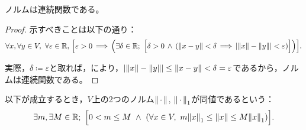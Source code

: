\documentclass[b5paper,oneside,openany]{ltjsbook} %
\begin{document}
\begin{cor}[ノルムの連続性]
    ノルムは連続関数である。
    \begin{proof}
        示すべきことは以下の通り：
        \begin{equation}
            \forall x,\forall y\in V,\ \forall \varepsilon\in\R,\, \squ{
                \varepsilon>0 \, \Longrightarrow\, \pare{
                    \exists \delta\in \R;\ \bsqu{
                        \delta>0\, \land\, \pare{
                            \norm{x-y}<\delta\, \Longrightarrow\, \abs{\norm{x}-\norm{y}}<\varepsilon
                        }
                    }
                }
            }.
        \end{equation}

        実際，$\delta\coloneqq \varepsilon$と取れば，により，$\abs{\norm{x}-\norm{y}}\leq \norm{x-y}<\delta =\varepsilon$であるから，ノルムは連続関数である。
    \end{proof}
\end{cor}

\begin{defi}[ノルムの同値性]
    以下が成立するとき，$V$上の2つのノルム$\norm{\dummy}$, $\norm{\dummy}_1$が同値であるという：
    \begin{equation}
        \exists m, \exists M\in\R;\ \bsqu{0<m\leq M\ \land \ \pare{
            \forall x\in V,\ m\norm{x}_1 \leq \norm{x} \leq M\norm{x}_1
        }}.
    \end{equation}
\end{defi}
\end{document}
